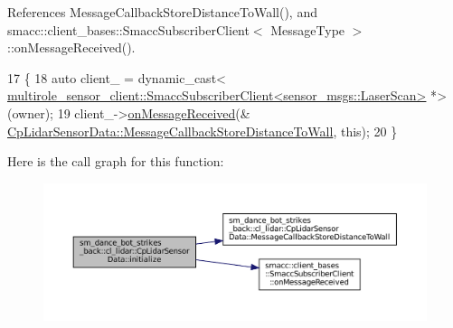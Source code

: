References Message\+Callback\+Store\+Distance\+To\+Wall(), and smacc\+::client\+\_\+bases\+::\+Smacc\+Subscriber\+Client$<$ Message\+Type $>$\+::on\+Message\+Received().


\begin{DoxyCode}
17   \{
18     \textcolor{keyword}{auto} client\_ = \textcolor{keyword}{dynamic\_cast<}
      \hyperlink{classsmacc_1_1client__bases_1_1SmaccSubscriberClient}{multirole\_sensor\_client::SmaccSubscriberClient<sensor\_msgs::LaserScan>}
       *\textcolor{keyword}{>}(owner);
19     client\_->\hyperlink{classsmacc_1_1client__bases_1_1SmaccSubscriberClient_a4f02251e3a161fb6d802b154b1081f18}{onMessageReceived}(&
      \hyperlink{classsm__dance__bot__strikes__back_1_1cl__lidar_1_1CpLidarSensorData_aefe481c1441305a6adf5266c49d941a4}{CpLidarSensorData::MessageCallbackStoreDistanceToWall},
       \textcolor{keyword}{this});
20   \}
\end{DoxyCode}
Here is the call graph for this function\+:
\nopagebreak
\begin{figure}[H]
\begin{center}
\leavevmode
\includegraphics[width=350pt]{classsm__dance__bot__strikes__back_1_1cl__lidar_1_1CpLidarSensorData_a8ea64aab6a48e8359a195a8766703c26_cgraph}
\end{center}
\end{figure}
\mbox{\label{classsm__dance__bot__strikes__back_1_1cl__lidar_1_1CpLidarSensorData_aefe481c1441305a6adf5266c49d941a4}} 
